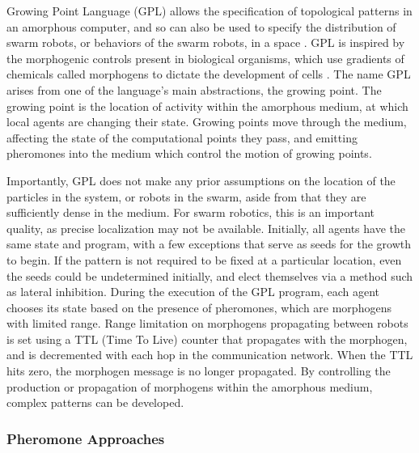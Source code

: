 Growing Point Language (GPL) allows the specification of topological patterns in an amorphous computer, and so can also be used to specify the distribution of swarm robots, or behaviors of the swarm robots, in a space \cite{nagpal2004engineering}. 
GPL is inspired by the morphogenic controls present in biological organisms, which use gradients of chemicals called morphogens to dictate the development of cells \cite{turing1952chemical}.
The name GPL arises from one of the language's main abstractions, the growing point. 
The growing point is the location of activity within the amorphous medium, at which local agents are changing their state. 
Growing points move through the medium, affecting the state of the computational points they pass, and emitting pheromones into the medium which control the motion of growing points.

Importantly, GPL does not make any prior assumptions on the location of the particles in the system, or robots in the swarm, aside from that they are sufficiently dense in the medium. 
For swarm robotics, this is an important quality, as precise localization may not be available. 
Initially, all agents have the same state and program, with a few exceptions that serve as seeds for the growth to begin. 
If the pattern is not required to be fixed at a particular location, even the seeds could be undetermined initially, and elect themselves via a method such as lateral inhibition. 
During the execution of the GPL program, each agent chooses its state based on the presence of pheromones, which are morphogens with limited range. 
Range limitation on morphogens propagating between robots is set using a TTL (Time To Live) counter that propagates with the morphogen, and is decremented with each hop in the communication network. 
When the TTL hits zero, the morphogen message is no longer propagated. 
By controlling the production or propagation of morphogens within the amorphous medium, complex patterns can be developed. 

\subsubsection{Pheromone Approaches}

